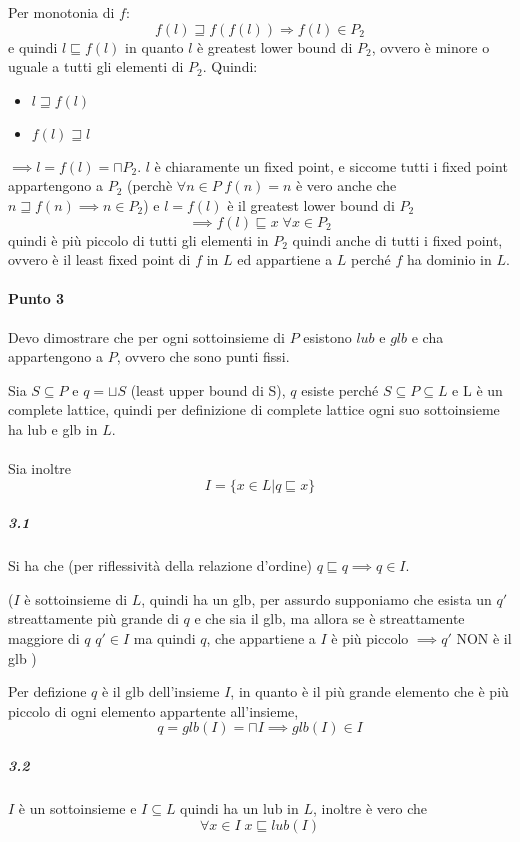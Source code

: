 \documentclass{article}
\newcommand{\pd}{P_{2}}
\begin{document}
Per monotonia di $f$: $$f(l) \sqsupseteq f(f(l)) \Rightarrow f(l) \in \pd$$ e quindi $l\sqsubseteq f(l)$ in quanto $l$ è greatest lower bound di $\pd$, ovvero è minore o uguale a tutti gli elementi di $\pd$. Quindi:
\begin{itemize}
    \item $l\sqsupseteq f(l)$
    \item $f(l) \sqsupseteq l$
\end{itemize}
$\implies l = f(l) = \sqcap \pd $. $ l $ è chiaramente un fixed point, e siccome tutti i fixed point appartengono a $ \pd $ (perchè $ \forall n \in P \; f(n) = n $ è vero anche che $ n \sqsupseteq f(n) \implies n \in P_{2} $) e $l=f(l)$ è il greatest lower bound di $\pd$ $$\implies f(l) \sqsubseteq x \; \forall x \in \pd $$ quindi è più piccolo di tutti gli elementi in $\pd$ quindi anche di tutti i fixed point, ovvero è il least fixed point di $f$ in $L$ ed appartiene a $L$ perché $f$ ha dominio in $L$.

\paragraph{Punto 3}
Devo dimostrare che per ogni sottoinsieme di $P$ esistono $lub$ e $glb$ e cha appartengono a $P$, ovvero che sono punti fissi.

Sia $ S \subseteq P$ e $ q = \sqcup S$ (least upper bound di S), $q$ esiste perché $S \subseteq P \subseteq L$ e L è un complete lattice, quindi per definizione di complete lattice ogni suo sottoinsieme ha lub e glb in $L$.\\\\
Sia inoltre $$I=\{x \in L | q \sqsubseteq x\}$$

\subparagraph{3.1}Si ha che (per riflessività della relazione d'ordine) $q \sqsubseteq q \implies q \in I$.

($I$ è sottoinsieme di $L$, quindi ha un glb, per assurdo supponiamo che esista un $q'$ streattamente più grande di $q$ e che sia il glb, ma allora se è streattamente maggiore di $q$ $q'\in I$ ma quindi $q$, che appartiene a $I$ è più piccolo $\implies q'$ NON è il glb  )

Per defizione $q$ è il glb dell'insieme $I$, in quanto è il più grande elemento che è più piccolo di ogni elemento appartente all'insieme, $$q=glb(I)= \sqcap I \implies glb(I) \in I$$

\subparagraph{3.2}

$I$ è un sottoinsieme e $I\subseteq L$ quindi ha un lub in $L$, inoltre è vero che $$\forall x \in I \; x \sqsubseteq lub(I)$$ 
\end{document}
